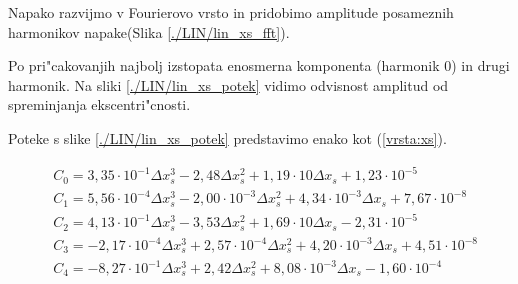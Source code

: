 
Napako razvijmo v Fourierovo vrsto in pridobimo amplitude posameznih harmonikov napake(Slika \ref{./LIN/lin_xs_fft}).

Po pri"cakovanjih najbolj izstopata enosmerna komponenta (harmonik 0) in drugi harmonik. Na sliki \ref{./LIN/lin_xs_potek} vidimo odvisnost amplitud od spreminjanja ekscentri"cnosti.


Poteke s slike \ref{./LIN/lin_xs_potek} predstavimo enako kot (\ref{vrsta:xs}).

\begin{eqnarray}
&C_0 =3,35\cdot 10^{-1}\Delta x_s^{3}-2,48\Delta x_s^{2}+1,19\cdot 10\Delta x_s+1,23\cdot 10^{-5} \\
&C_1 =5,56\cdot 10^{-4}\Delta x_s^{3}-2,00\cdot 10^{-3}\Delta x_s^{2}+4,34\cdot 10^{-3}\Delta x_s+7,67\cdot 10^{-8} \\
&C_2 =4,13\cdot 10^{-1}\Delta x_s^{3}-3,53\Delta x_s^{2}+1,69\cdot 10\Delta x_s-2,31\cdot 10^{-5} \\
&C_3 =-2,17\cdot 10^{-4}\Delta x_s^{3}+2,57\cdot 10^{-4}\Delta x_s^{2}+4,20\cdot 10^{-3}\Delta x_s+4,51\cdot 10^{-8} \\
&C_4 =-8,27\cdot 10^{-1}\Delta x_s^{3}+2,42\Delta x_s^{2}+8,08\cdot 10^{-3}\Delta x_s-1,60\cdot 10^{-4}
\end{eqnarray}




